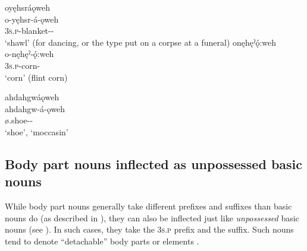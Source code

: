 \ea\label{ex:unpossnounppex9} 
\ea oyęhsráǫweh \\
\gll o-yęhsr-á-ǫweh \\
\textsc{3s.p}-blanket-{\joinerA}-{\typicalizer}\\
\glt ‘shawl’ (for dancing, or the type put on a corpse at a funeral)
\ex onęhęˀǫ́:weh \\
\gll o-nęhęˀ-ǫ́:weh \\
\textsc{3s.p}-corn-{\typicalizer}\\
\glt ‘corn’ (flint corn) 
\z
\z

\ea\label{ex:unpossnounppex7}
ahdahgwáǫweh \\
ahdahgw-á-ǫweh \\
ø.shoe-{\joinerA}-{\typicalizer}\\
\glt ‘shoe’, ‘moccasin’
\z

\subsection{Body part nouns inflected as unpossessed basic nouns} \label{ch:Body part nouns inflected as unpossessed basic nouns}
While body part nouns generally take different prefixes and suffixes than basic nouns do (as described in ), they can also be inflected just like \emph{unpossessed} basic nouns (see ). In such cases, they take the  \textsc{3s.p} prefix and the  \textsc{\nsf} suffix. Such nouns tend to denote “detachable” body parts or elements .

